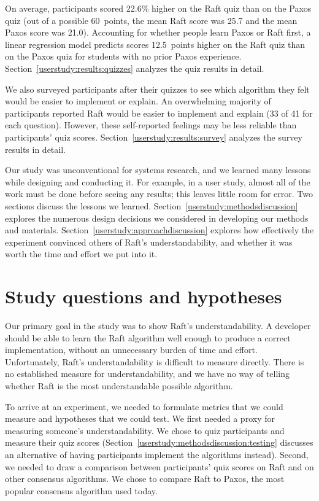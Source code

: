 On average, participants scored 22.6\% higher on the Raft
quiz than on the
Paxos quiz (out of a possible \SI{60}{points}, the mean Raft score was 25.7
and the mean Paxos score was 21.0). Accounting for whether people learn
Paxos or Raft first, a linear regression
model predicts scores \SI{12.5}{points} higher
on the Raft quiz than on the
Paxos quiz for students with no prior Paxos experience.
Section~\ref{userstudy:results:quizzes} analyzes the quiz
results in detail.

We also surveyed participants after their quizzes to see which algorithm
they felt would be easier to implement or explain. An overwhelming
majority of participants reported Raft would be easier to implement and
explain (33 of 41 for each question). However, these self-reported
feelings may be less reliable than participants' quiz scores.
Section~\ref{userstudy:results:survey} analyzes the survey results in
detail.

Our study was unconventional for systems research, and we learned many
lessons while designing and conducting it.
For example, in a user study, almost all of the work must be done before
seeing any results; this leaves little room for error.
Two sections discuss the lessons we learned.
Section~\ref{userstudy:methodsdiscussion} explores the numerous design
decisions we considered in developing our methods and materials.
Section~\ref{userstudy:approachdiscussion} explores how effectively the
experiment convinced others of Raft's understandability, and
whether it was worth the time and effort we put into it.

\section{Study questions and hypotheses}

Our primary goal in the study was to show Raft's understandability. A
developer should be able to learn the Raft algorithm well enough to
produce a correct implementation, without an
unnecessary burden of time and effort. Unfortunately, Raft's
understandability is difficult to measure directly. There is no
established measure for understandability, and we have no way of telling
whether Raft is the most understandable possible algorithm.

To arrive at an experiment, we needed to formulate metrics that we could
measure and hypotheses that we could test.
We first needed a proxy
for measuring someone's understandability. We chose to quiz participants
and measure their quiz scores
(Section~\ref{userstudy:methodsdiscussion:testing} discusses an
alternative of having participants implement the algorithms instead).
Second, we needed to draw a comparison between participants' quiz scores
on Raft and on other consensus algorithms. We chose to compare Raft to
Paxos, the most popular consensus algorithm used today.

